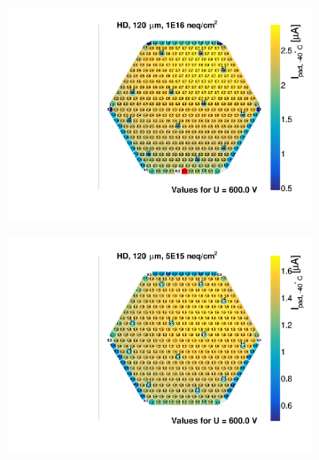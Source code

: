 \begin{figure}
	\captionsetup[subfigure]{aboveskip=-1pt,belowskip=-1pt}
	\centering
	\begin{subfigure}[b]{0.32\textwidth}
		\includegraphics[width=0.999\textwidth]{plots/iv_hexplots/3003.pdf}
		\subcaption{
		}
		\label{plot:iv_hexplot_3003}
	\end{subfigure}
	\hfill
	\begin{subfigure}[b]{0.32\textwidth}
		\includegraphics[width=0.999\textwidth]{plots/iv_hexplots/3009.pdf}
		\subcaption{
		}
		\label{plot:iv_hexplot_3009}
	\end{subfigure}
	\hfill
	\begin{subfigure}[b]{0.32\textwidth}

\end{subfigure}
\end{figure}
